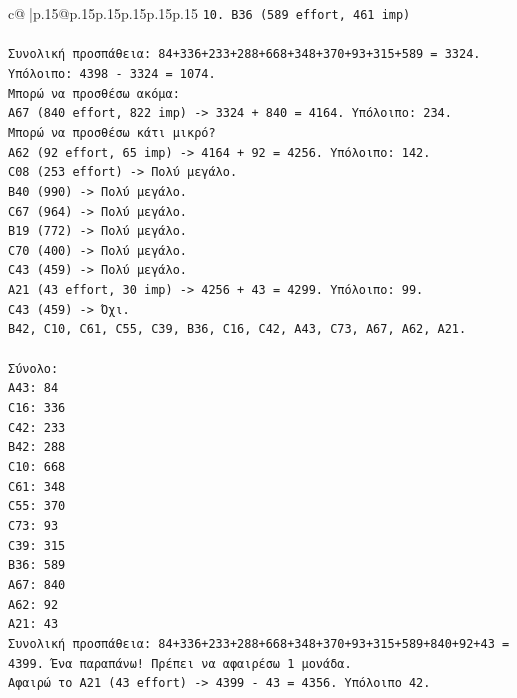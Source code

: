 \documentclass{article}
\begin{document}
{\begin{supertabular}{c@{$\;$}|p{.15\linewidth}@{}p{.15\linewidth}p{.15\linewidth}p{.15\linewidth}p{.15\linewidth}p{.15\linewidth}}
{{{\texttt{10. B36 (589 effort, 461 imp)} \\
\\ 
\texttt{Συνολική προσπάθεια: 84+336+233+288+668+348+370+93+315+589 = 3324.} \\
\texttt{Υπόλοιπο: 4398 {-} 3324 = 1074.} \\
\texttt{Μπορώ να προσθέσω ακόμα:} \\
\texttt{A67 (840 effort, 822 imp) {-}> 3324 + 840 = 4164. Υπόλοιπο: 234.} \\
\texttt{Μπορώ να προσθέσω κάτι μικρό?} \\
\texttt{A62 (92 effort, 65 imp) {-}> 4164 + 92 = 4256. Υπόλοιπο: 142.} \\
\texttt{C08 (253 effort) {-}> Πολύ μεγάλο.} \\
\texttt{B40 (990) {-}> Πολύ μεγάλο.} \\
\texttt{C67 (964) {-}> Πολύ μεγάλο.} \\
\texttt{B19 (772) {-}> Πολύ μεγάλο.} \\
\texttt{C70 (400) {-}> Πολύ μεγάλο.} \\
\texttt{C43 (459) {-}> Πολύ μεγάλο.} \\
\texttt{A21 (43 effort, 30 imp) {-}> 4256 + 43 = 4299. Υπόλοιπο: 99.} \\
\texttt{C43 (459) {-}> Όχι.} \\
\texttt{B42, C10, C61, C55, C39, B36, C16, C42, A43, C73, A67, A62, A21.} \\
\\ 
\texttt{Σύνολο:} \\
\texttt{A43: 84} \\
\texttt{C16: 336} \\
\texttt{C42: 233} \\
\texttt{B42: 288} \\
\texttt{C10: 668} \\
\texttt{C61: 348} \\
\texttt{C55: 370} \\
\texttt{C73: 93} \\
\texttt{C39: 315} \\
\texttt{B36: 589} \\
\texttt{A67: 840} \\
\texttt{A62: 92} \\
\texttt{A21: 43} \\
\texttt{Συνολική προσπάθεια: 84+336+233+288+668+348+370+93+315+589+840+92+43 = 4399. Ένα παραπάνω! Πρέπει να αφαιρέσω 1 μονάδα.} \\
\texttt{Αφαιρώ το A21 (43 effort) {-}> 4399 {-} 43 = 4356. Υπόλοιπο 42.} \\
}}}
\end{supertabular}}
\end{document}
